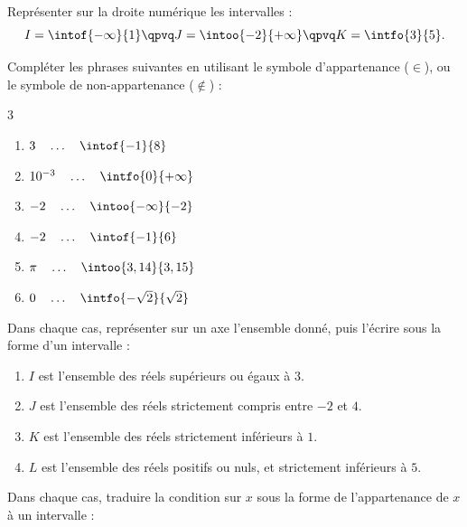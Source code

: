 \exo

Représenter sur la droite numérique les intervalles :
\[
I=\intof{-\infty}{1}
\qpvq
J=\intoo{-2}{+\infty}
\qpvq
K=\intfo{3}{5}.
\]

\exo

Compléter les phrases suivantes en utilisant le symbole d'appartenance ($\in$), ou le symbole de non-appartenance ($\notin$) :

\vspace{-6pt}
\setlength{\columnsep}{1cm}
\setlength{\columnseprule}{0pt}
\begin{multicols}{3}
\begin{enumerate}
\item $3\quad\dots{}\quad\intof{-1}{8}$

\medskip
\item $10^{-3}\quad\dots{}\quad\intfo{0}{+\infty}$
\item $-2\quad\dots{}\quad\intoo{-\infty}{-2}$

\medskip
\item $-2\quad\dots{}\quad\intof{-1}{6}$
\item $\pi\quad\dots{}\quad\intoo{3,14}{3,15}$

\medskip
\item $0\quad\dots{}\quad\intfo{-\sqrt{2}}{\sqrt{2}}$
\end{enumerate}
\end{multicols}

\exo

Dans chaque cas, représenter sur un axe l'ensemble donné, puis l'écrire sous la forme d'un intervalle :

\begin{enumerate}
\item $I$ est l'ensemble des réels supérieurs ou égaux à $3$.
\item $J$ est l'ensemble des réels strictement compris entre $-2$ et $4$.
\item $K$ est l'ensemble des réels strictement inférieurs à $1$.
\item $L$ est l'ensemble des réels positifs ou nuls, et strictement inférieurs à $5$.
\end{enumerate}

\exo

Dans chaque cas, traduire la condition sur $x$ sous la forme de l'appartenance de $x$ à un intervalle :

